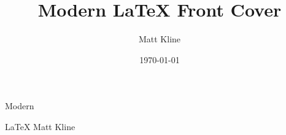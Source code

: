 \documentclass[fontsize=11bp]{scrartcl}
\title{Modern LaTeX Front Cover}
\author{Matt Kline}
\date{\today}
\begin{document}
\fontsize{11bp}{14bp}\selectfont
\pagestyle{empty}
\vspace*{1in}
\begin{center}
\fontsize{0.7in}{0.7in}\selectfont
Modern

\fontsize{1.4in}{1.3in}\selectfont
\LaTeX
\vfill
\LARGE
Matt Kline
\end{center}
\end{document}
